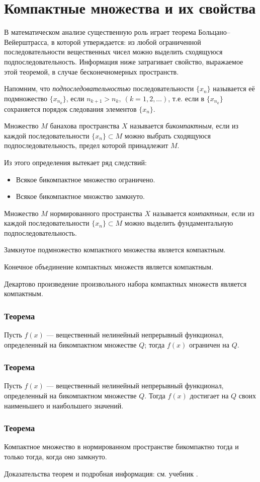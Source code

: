 \section{Компактные множества и их свойства}
\label{sec:q-34}
В математическом анализе существенную роль играет теорема Больцано--Вейерштрасса, в которой утверждается: из любой ограниченной последовательности вещественных чисел можно выделить сходящуюся подпоследовательность. Информация ниже затрагивает свойство, выражаемое этой теоремой, в случае бесконечномерных пространств.

Напомним, что \textit{подпоследовательностью} последовательности $\{x_n\}$ называется её подмножество $\{x_{n_k}\}$, если $n_{k+1} > n_k, \ (k = 1, 2, \dots)$, т.е. если в $\{x_{n_k}\}$ сохраняется порядок следования элементов $\{x_n\}$.

Множество $M$ банахова пространства $X$ называется \textit{бикомпактным}, если из каждой последовательности $\{x_n\} \subset M$ можно выбрать сходящуюся подпоследовательность, предел которой принадлежит $M$.

Из этого определения вытекает ряд следствий:
\begin{itemize}
	\itemsep0pt
	\item Всякое бикомпактное множество ограничено.
	\item Всякое бикомпактное множство замкнуто.
\end{itemize}
Множество $M$ нормированного пространства $X$ называется \textit{компактным}, если из каждой последовательности $\{x_n\} \subset M$ можно выделить фундаментальную подпоследовательность.

Замкнутое подмножество компактного множества является компактным.

Конечное объединение компактных множеств является компактным.

Декартово произведение произвольного набора компактных множеств является компактным.

\subsubsection*{Теорема}
Пусть $f(x)$ --- вещественный нелинейный непрерывный функционал, определенный на бикомпактном множестве $Q$; тогда $f(x)$ ограничен на $Q$.

\subsubsection*{Теорема}
Пусть $f(x)$ --- вещественный нелинейный непрерывный функционал, определенный на бикомпактном множестве $Q$. Тогда $f(x)$ достигает на $Q$ своих наименьшего и наибольшего значений.

\subsubsection*{Теорема}
Компактное множество в нормированном пространстве бикомпактно тогда и только тогда, когда оно замкнуто.

Доказательства теорем и подробная информация: см. учебник \cite[с.~194]{trenogin}.
